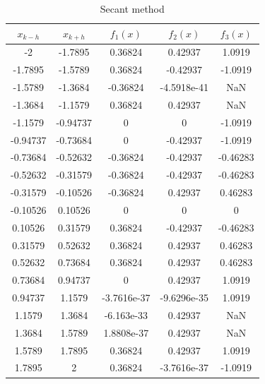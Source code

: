 \documentclass[11pt]{article}
\newcommand{\1}{\mathbbm{1}}
\begin{document}
	\begin{table}[h]
	\centering
	\begin{tabular}{c c c c c }
		\hline
		\hline
		     $x_{k-h}$ &    $x_{k+h}$   &   $f_{1}(x)$   &    $f_{2}(x)$   &   $f_{3}(x)$\\
		\hline
		-2 &    -1.7895   &     0.36824  &      0.42937  &    1.0919 \\
		-1.7895 &    -1.5789   &     0.36824  &     -0.42937  &   -1.0919 \\
		-1.5789 &    -1.3684   &    -0.36824  &  -4.5918e-41  &       NaN \\
		-1.3684 &    -1.1579   &     0.36824  &      0.42937  &       NaN \\
		-1.1579 &   -0.94737   &           0  &            0  &   -1.0919 \\
		-0.94737 &   -0.73684   &           0  &     -0.42937  &   -1.0919 \\
		-0.73684 &   -0.52632   &    -0.36824  &     -0.42937  &  -0.46283 \\
		-0.52632 &   -0.31579   &    -0.36824  &     -0.42937  &  -0.46283 \\
		-0.31579 &   -0.10526   &    -0.36824  &      0.42937  &   0.46283 \\
		-0.10526 &    0.10526   &           0  &            0  &         0 \\
		0.10526 &    0.31579   &     0.36824  &     -0.42937  &  -0.46283 \\
		0.31579 &    0.52632   &     0.36824  &      0.42937  &   0.46283 \\
		0.52632 &    0.73684   &     0.36824  &      0.42937  &   0.46283 \\
		0.73684 &    0.94737   &           0  &      0.42937  &    1.0919 \\
		0.94737 &     1.1579   & -3.7616e-37  &  -9.6296e-35  &    1.0919 \\
		1.1579 &     1.3684   &  -6.163e-33  &      0.42937  &       NaN \\
		1.3684 &     1.5789   &  1.8808e-37  &      0.42937  &       NaN \\
		1.5789 &     1.7895   &     0.36824  &      0.42937  &    1.0919 \\
		1.7895 &          2   &     0.36824  &  -3.7616e-37  &   -1.0919 \\
		\hline
		\hline
	\end{tabular} 
	\caption{Secant method}
	\label{tab:3:3}
\end{table}
\end{document}
